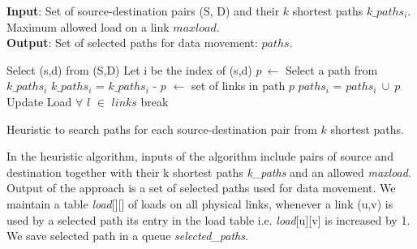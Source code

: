 \begin{algorithm}[!htbp]
\textbf{Input}: Set of source-destination pairs {(S, D)} and their $k$ shortest paths {$k\_paths_i$}. Maximum allowed load on a link $maxload$.\\
\textbf{Output}: Set of selected paths for data movement: {$paths$}.\\
\begin{algorithmic}
		\State Select (s,d) from {(S,D)} 
		\State Let i be the index of (s,d) 
		\State $p~\leftarrow$ Select a path from $k\_paths_i$ 
		\State $k\_paths_i$ = $k\_paths_i$ - {$p$} 
		 $\leftarrow$ set of links in path $p$ 
			\State $paths_i$ = $paths_i~\cup~{p}$ 
			\State Update Load $\forall$ $l$ $\in$ $links$ 
		\EndIf
			\State break 
		\EndIf
	\EndWhile
 \EndFunction
\end{algorithmic}
\caption{Heuristic to search paths for each source-destination pair from $k$ shortest paths.}
\label{alg:heu}
\end{algorithm}


In the heuristic algorithm, inputs of the algorithm include pairs of source and destination together with their k shortest paths \textit{k\_paths} and an allowed \textit{maxload}. Output of the approach is a set of selected paths used for data movement. We maintain a table \textit{load}[][] of loads on all physical links, whenever a link (u,v) is used by a selected path its entry in the load table i.e. \textit{load}[u][v] is increased by 1. We save selected path in a queue \textit{selected\_paths}.

